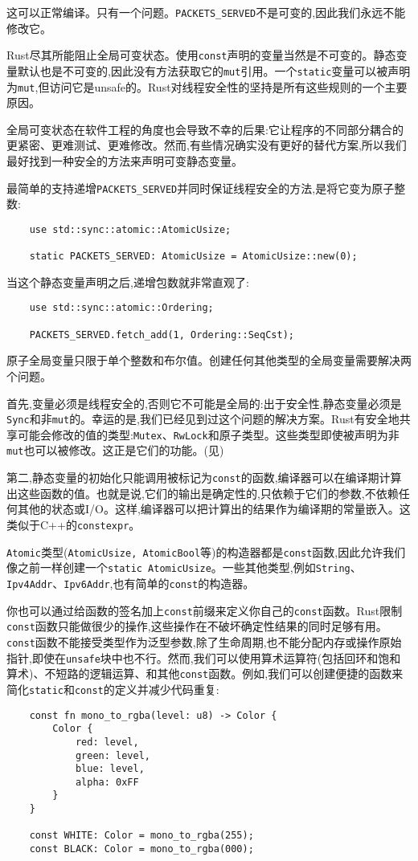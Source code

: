 这可以正常编译。只有一个问题。\texttt{PACKETS\_SERVED}不是可变的,因此我们永远不能修改它。

Rust尽其所能阻止全局可变状态。使用\texttt{const}声明的变量当然是不可变的。静态变量默认也是不可变的,因此没有方法获取它的\texttt{mut}引用。一个\texttt{static}变量可以被声明为\texttt{mut},但访问它是unsafe的。Rust对线程安全性的坚持是所有这些规则的一个主要原因。

全局可变状态在软件工程的角度也会导致不幸的后果:它让程序的不同部分耦合的更紧密、更难测试、更难修改。然而,有些情况确实没有更好的替代方案,所以我们最好找到一种安全的方法来声明可变静态变量。

最简单的支持递增\texttt{PACKETS\_SERVED}并同时保证线程安全的方法,是将它变为原子整数:
\begin{verbatim}
    use std::sync::atomic::AtomicUsize;

    static PACKETS_SERVED: AtomicUsize = AtomicUsize::new(0);
\end{verbatim}

当这个静态变量声明之后,递增包数就非常直观了:
\begin{verbatim}
    use std::sync::atomic::Ordering;

    PACKETS_SERVED.fetch_add(1, Ordering::SeqCst);
\end{verbatim}

原子全局变量只限于单个整数和布尔值。创建任何其他类型的全局变量需要解决两个问题。

首先,变量必须是线程安全的,否则它不可能是全局的:出于安全性,静态变量必须是\texttt{Sync}和非\texttt{mut}的。幸运的是,我们已经见到过这个问题的解决方案。Rust有安全地共享可能会修改的值的类型:\texttt{Mutex}、\texttt{RwLock}和原子类型。这些类型即使被声明为非\texttt{mut}也可以被修改。这正是它们的功能。(见)

第二,静态变量的初始化只能调用被标记为\texttt{const}的函数,编译器可以在编译期计算出这些函数的值。也就是说,它们的输出是确定性的,只依赖于它们的参数,不依赖任何其他的状态或I/O。这样,编译器可以把计算出的结果作为编译期的常量嵌入。这类似于C++的\texttt{constexpr}。

\texttt{Atomic}类型(\texttt{AtomicUsize, AtomicBool}等)的构造器都是\texttt{const}函数,因此允许我们像之前一样创建一个\texttt{static AtomicUsize}。一些其他类型,例如\texttt{String}、\texttt{Ipv4Addr}、\texttt{Ipv6Addr},也有简单的\texttt{const}的构造器。

你也可以通过给函数的签名加上\texttt{const}前缀来定义你自己的\texttt{const}函数。Rust限制\texttt{const}函数只能做很少的操作,这些操作在不破坏确定性结果的同时足够有用。\texttt{const}函数不能接受类型作为泛型参数,除了生命周期,也不能分配内存或操作原始指针,即使在\texttt{unsafe}块中也不行。然而,我们可以使用算术运算符(包括回环和饱和算术)、不短路的逻辑运算、和其他\texttt{const}函数。例如,我们可以创建便捷的函数来简化\texttt{static}和\texttt{const}的定义并减少代码重复:
\begin{verbatim}
    const fn mono_to_rgba(level: u8) -> Color {
        Color {
            red: level,
            green: level,
            blue: level,
            alpha: 0xFF
        }
    }

    const WHITE: Color = mono_to_rgba(255);
    const BLACK: Color = mono_to_rgba(000);
\end{verbatim}

